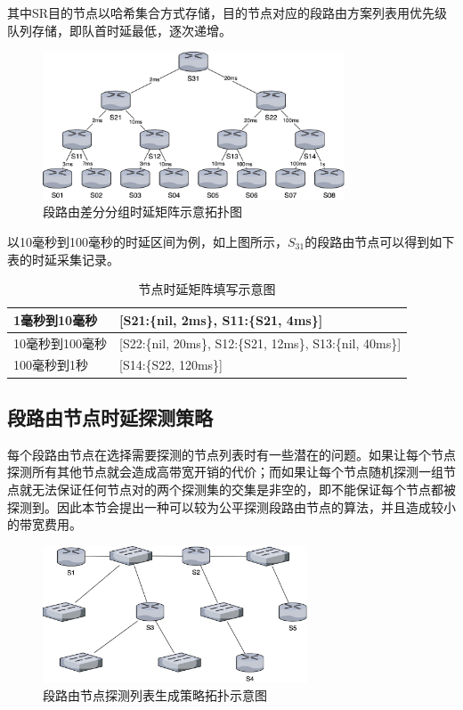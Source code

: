 其中SR目的节点以哈希集合方式存储，目的节点对应的段路由方案列表用优先级队列存储，即队首时延最低，逐次递增。

\begin{figure}[htbp]
\setlength{\abovecaptionskip}{15pt plus 3pt minus 2pt}
\centerline{\includegraphics[width=0.8\textwidth]{./figures/ch4-tree-topo.png}}
\caption{段路由差分分组时延矩阵示意拓扑图}
\label{fig-ch4-tree-topo}
\end{figure}

以10毫秒到100毫秒的时延区间为例，如上图所示，$S_{31}$的段路由节点可以得到如下表的时延采集记录。

\begin{table}[htbp]
\begin{tabular}{|p{}|p{}|}
\hline
1毫秒到10毫秒 & {[}S21:\{nil, 2ms\}, S11:\{S21, 4ms\}{]} \\ \hline
10毫秒到100毫秒 & {[}S22:\{nil, 20ms\}, S12:\{S21, 12ms\}, S13:\{nil, 40ms\}{]} \\ \hline
100毫秒到1秒 & {[}S14:\{S22, 120ms\}{]} \\ \hline
\end{tabular}
\caption{节点时延矩阵填写示意图}
\label{table-fullin-delay-metric}
\end{table}

\subsection{段路由节点时延探测策略}

每个段路由节点在选择需要探测的节点列表时有一些潜在的问题。如果让每个节点探测所有其他节点就会造成高带宽开销的代价；而如果让每个节点随机探测一组节点就无法保证任何节点对的两个探测集的交集是非空的，即不能保证每个节点都被探测到。因此本节会提出一种可以较为公平探测段路由节点的算法，并且造成较小的带宽费用。

\begin{figure}[htbp]
\setlength{\abovecaptionskip}{15pt plus 3pt minus 2pt}
\centerline{\includegraphics[width=0.7\textwidth]{./figures/ch4-random-topo.png}}
\caption{段路由节点探测列表生成策略拓扑示意图}
\label{fig-ch4-random-topo}
\end{figure}

